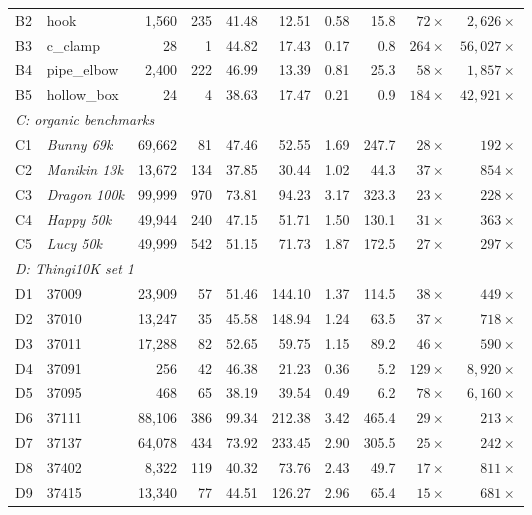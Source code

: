 \documentclass[11pt,a4paper]{article}
\begin{document}
\begin{table}[H]
{\begin{tabular}{llrrrrrrrr}
B2 & hook        & 1{,}560  & 235 & 41.48 & 12.51 & 0.58 & 15.8   & $72\times$  & $2{,}626\times$\\
B3 & c\_clamp     & 28     & 1   & 44.82 & 17.43 & 0.17 & 0.8    & $264\times$ & $56{,}027\times$\\
B4 & pipe\_elbow  & 2{,}400  & 222 & 46.99 & 13.39 & 0.81 & 25.3   & $58\times$  & $1{,}857\times$\\
B5 & hollow\_box  & 24     & 4   & 38.63 & 17.47 & 0.21 & 0.9    & $184\times$ & $42{,}921\times$\\
\midrule
\multicolumn{10}{l}{\textit{C: organic benchmarks}}\\
C1 & \emph{Bunny 69k}       & 69{,}662 & 81  & 47.46 & 52.55 & 1.69 & 247.7 & $28\times$ & $192\times$\\
C2 & \emph{Manikin 13k}     & 13{,}672 & 134 & 37.85 & 30.44 & 1.02 & 44.3  & $37\times$ & $854\times$\\
C3 & \emph{Dragon 100k}      & 99{,}999 & 970 & 73.81 & 94.23 & 3.17 & 323.3 & $23\times$ & $228\times$\\
C4 & \emph{Happy 50k}       & 49{,}944 & 240 & 47.15 & 51.71 & 1.50 & 130.1 & $31\times$ & $363\times$\\
C5 & \emph{Lucy 50k}        & 49{,}999 & 542 & 51.15 & 71.73 & 1.87 & 172.5 & $27\times$ & $297\times$\\
\midrule
\multicolumn{10}{l}{\textit{D: Thingi10K set 1}}\\
D1  & 37009 & 23{,}909 & 57  & 51.46 & 144.10 & 1.37 & 114.5 & $38\times$ & $449\times$\\
D2  & 37010 & 13{,}247 & 35  & 45.58 & 148.94 & 1.24 & 63.5  & $37\times$ & $718\times$\\
D3  & 37011 & 17{,}288 & 82  & 52.65 & 59.75  & 1.15 & 89.2  & $46\times$ & $590\times$\\
D4  & 37091 & 256    & 42  & 46.38 & 21.23  & 0.36 & 5.2   & $129\times$ & $8{,}920\times$\\
D5  & 37095 & 468    & 65  & 38.19 & 39.54  & 0.49 & 6.2   & $78\times$ & $6{,}160\times$\\
D6  & 37111 & 88{,}106 & 386 & 99.34 & 212.38 & 3.42 & 465.4 & $29\times$ & $213\times$\\
D7  & 37137 & 64{,}078 & 434 & 73.92 & 233.45 & 2.90 & 305.5 & $25\times$ & $242\times$\\
D8  & 37402 & 8{,}322  & 119 & 40.32 & 73.76  & 2.43 & 49.7  & $17\times$ & $811\times$\\
D9  & 37415 & 13{,}340 & 77  & 44.51 & 126.27 & 2.96 & 65.4  & $15\times$ & $681\times$\\

\end{tabular}}
\end{table}
\end{document}
